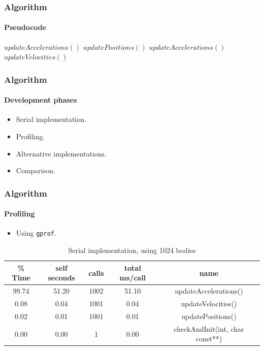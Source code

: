 \begin{frame}[fragile]
	\frametitle{Algorithm}
	\framesubtitle{Pseudocode}
	\begin{center}
		\begin{algorithmic}
			\STATE $updateAccelerations()$
			    \STATE $updatePositions()$
			    \STATE $updateAccelerations()$
			    \STATE $updateVelocities()$
			\ENDFOR
		\end{algorithmic}
	\end{center}
\end{frame}

\frame
{
    \frametitle{Algorithm}
    \framesubtitle{Development phases}
    \begin{itemize}
        \item Serial implementation.
        \item Profiling.
        \item Alternative implementations.
        \item Comparison.
    \end{itemize}
}


\begin{frame}[fragile]
    \frametitle{Algorithm}
    \framesubtitle{Profiling}
     \begin{itemize}
         \item Using \texttt{gprof}.
     \end{itemize}
     \begin{table}[h!t]
        \centering
        \scriptsize
        \begin{tabular}{|c|c|c|c|c|}
           \hline
           {\bf \% Time } & {\bf self seconds} & {\bf calls} & {\bf total ms/call} & {\bf name} \\\hline
             99.74   &  51.20   &  1002   &  51.10  & updateAccelerations() \\\hline
              0.08   &   0.04   &  1001   &   0.04  & updateVelocities()\\\hline
              0.02   &   0.01   &  1001   &   0.01  & updatePositions()\\\hline
              0.00   &   0.00   &     1   &   0.00  & checkAndInit(int, char const**)\\\hline
        \end{tabular}
        \caption{Serial implementation, using 1024 bodies}
     \end{table}
\end{frame}

